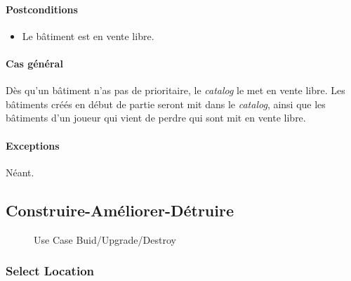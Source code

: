 \documentclass[a4paper,11pt]{report}
\begin{document}
\paragraph{Postconditions}
\begin{itemize}
 \item Le bâtiment est en vente libre.
\end{itemize}
\paragraph{Cas général}
Dès qu'un bâtiment n'as pas de prioritaire, le \textit{catalog} le met en vente libre. Les bâtiments créés en début de partie seront mit dans le \textit{catalog}, ainsi que les bâtiments d'un joueur qui vient de perdre qui sont mit en vente libre.
\paragraph{Exceptions} Néant.

\newpage
\subsection{Construire-Améliorer-Détruire}
\begin{figure}[ht]
    \caption{Use Case Buid/Upgrade/Destroy}
\end{figure}

\subsubsection{Select Location}
\end{document}
